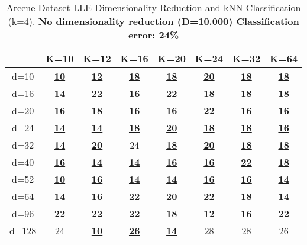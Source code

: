 \begin{table}[H]
\centering
\label{tab:table19}
\begin{tabular}{|c|c|c|c|c|c|c|c|}
\hline
 & K=10 & K=12 & K=16 & K=20 & K=24 & K=32 & K=64 \\
\hline
\textlatin{d}=10 & \underline{\textbf{10}} & \underline{\textbf{12}} & \underline{\textbf{18}} & \underline{\textbf{18}} & \underline{\textbf{20}} & \underline{\textbf{18}} & \underline{\textbf{18}} \\
\textlatin{d}=16 & \underline{\textbf{14}} & \underline{\textbf{22}} & \underline{\textbf{16}} & \underline{\textbf{22}} & \underline{\textbf{18}} & \underline{\textbf{18}} & \underline{\textbf{18}} \\
\textlatin{d=20} & \underline{\textbf{16}} & \underline{\textbf{18}} & \underline{\textbf{16}} & \underline{\textbf{16}} & \underline{\textbf{22}} & \underline{\textbf{16}} & \underline{\textbf{16}} \\
\textlatin{d}=24 & \underline{\textbf{14}} & \underline{\textbf{14}} & \underline{\textbf{18}} & \underline{\textbf{20}} & \underline{\textbf{18}} & \underline{\textbf{18}} & \underline{\textbf{16}} \\
\textlatin{d}=32 & \underline{\textbf{14}} & \underline{\textbf{20}} & 24 & \underline{\textbf{18}} & \underline{\textbf{20}} & \underline{\textbf{18}} & \underline{\textbf{18}} \\
\textlatin{d}=40 & \underline{\textbf{16}} & \underline{\textbf{14}} & \underline{\textbf{14}} & \underline{\textbf{16}} & \underline{\textbf{16}} & \underline{\textbf{22}} & \underline{\textbf{18}} \\
\textlatin{d}=52 & \underline{\textbf{10}} & \underline{\textbf{16}} & \underline{\textbf{14}} & \underline{\textbf{14}} & \underline{\textbf{16}} & \underline{\textbf{16}} & \underline{\textbf{14}} \\
\textlatin{d}=64 & \underline{\textbf{14}} & \underline{\textbf{16}} & \underline{\textbf{22}} & \underline{\textbf{20}} & \underline{\textbf{22}} & \underline{\textbf{18}} & \underline{\textbf{14}} \\
\textlatin{d}=96 & \underline{\textbf{22}} & \underline{\textbf{22}} & \underline{\textbf{22}} & \underline{\textbf{18}} & \underline{\textbf{12}} & \underline{\textbf{16}} & \underline{\textbf{22}} \\
\textlatin{d}=128 & 24 & \underline{\textbf{10}} & \underline{\textbf{26}} & \underline{\textbf{14}} & 28 & 28 & 26 \\
\hline
\end{tabular}
\caption{\textlatin{Arcene Dataset LLE Dimensionality Reduction and kNN Classification (k=4). \textbf{No dimensionality reduction (D=10.000) Classification error: 24\%}}}
\end{table}

